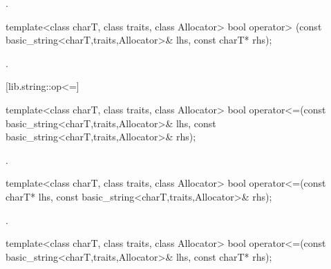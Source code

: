 \begin{itemdescr}
\pnum
\returns
{}.
\end{itemdescr}

%
%
\begin{itemdecl}
template<class charT, class traits, class Allocator>
  bool operator> (const basic_string<charT,traits,Allocator>& lhs,
                  const charT* rhs);
\end{itemdecl}

\begin{itemdescr}
\pnum
\returns
{}.
\end{itemdescr}

[lib.string::op<=]{}

%
%
\begin{itemdecl}
template<class charT, class traits, class Allocator>
  bool operator<=(const basic_string<charT,traits,Allocator>& lhs,
                  const basic_string<charT,traits,Allocator>& rhs);
\end{itemdecl}

\begin{itemdescr}
\pnum
\returns
{}.
\end{itemdescr}

%
%
\begin{itemdecl}
template<class charT, class traits, class Allocator>
  bool operator<=(const charT* lhs,
                  const basic_string<charT,traits,Allocator>& rhs);
\end{itemdecl}

\begin{itemdescr}
\pnum
\returns
{}.
\end{itemdescr}

%
%
\begin{itemdecl}
template<class charT, class traits, class Allocator>
  bool operator<=(const basic_string<charT,traits,Allocator>& lhs,
                  const charT* rhs);
\end{itemdecl}

